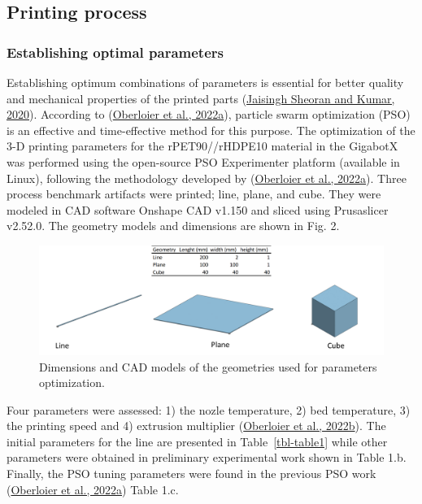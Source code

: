 \documentclass[
  12pt,
  number,
  review]{elsarticle}
\begin{document}
\hypertarget{printing-process}{%
\subsection{Printing process}\label{printing-process}}

\hypertarget{establishing-optimal-parameters}{%
\subsubsection{Establishing optimal
parameters}\label{establishing-optimal-parameters}}

Establishing optimum combinations of parameters is essential for better
quality and mechanical properties of the printed parts
(\protect\hyperlink{ref-jaisinghsheoran2020}{Jaisingh Sheoran and Kumar,
2020}). According to (\protect\hyperlink{ref-oberloier2022}{Oberloier et
al., 2022a}), particle swarm optimization (PSO) is an effective and
time-effective method for this purpose. The optimization of the 3-D
printing parameters for the rPET90//rHDPE10 material in the GigabotX was
performed using the open-source PSO Experimenter platform (available in
Linux), following the methodology developed by
(\protect\hyperlink{ref-oberloier2022}{Oberloier et al., 2022a}). Three
process benchmark artifacts were printed; line, plane, and cube. They
were modeled in CAD software Onshape CAD v1.150 and sliced using
Prusaslicer v2.52.0. The geometry models and dimensions are shown in
Fig. 2.

\begin{figure}

{\centering \includegraphics{figures/Figure-2.png}

}

\caption{Dimensions and CAD models of the geometries used for parameters
optimization.}

\end{figure}

Four parameters were assessed: 1) the nozle temperature, 2) bed
temperature, 3) the printing speed and 4) extrusion multiplier
(\protect\hyperlink{ref-oberloier2022a}{Oberloier et al., 2022b}). The
initial parameters for the line are presented in Table~\ref{tbl-table1}
while other parameters were obtained in preliminary experimental work
shown in Table 1.b. Finally, the PSO tuning parameters were found in the
previous PSO work (\protect\hyperlink{ref-oberloier2022}{Oberloier et
al., 2022a}) Table 1.c.
\end{document}
